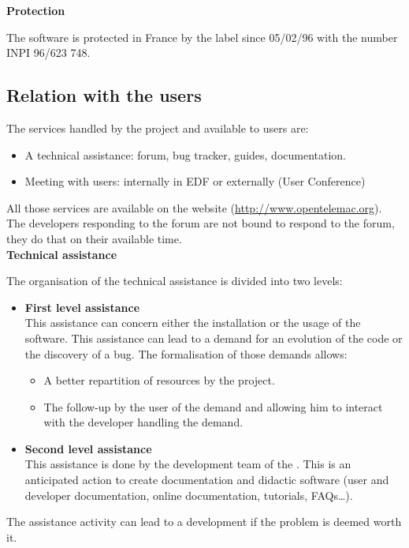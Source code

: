 \textbf{Protection}

The software is protected in France by the label \tel{} since 05/02/96 with the
number INPI 96/623 748.

\subsection{Relation with the \telemacsystem{} users}

The services handled by the \telemacsystem{} project and available to users
are:
\begin{itemize}
\item A technical assistance: forum, bug tracker, guides, documentation.
\item Meeting with users: internally in EDF or externally (User Conference)
\end{itemize}

All those services are available on the \telemacsystem{} website
(\url{http://www.opentelemac.org}).
The developers responding to the forum are not bound to respond to the forum,
they do that on their available time.\\

\textbf{Technical assistance}

The organisation of the technical assistance is divided into two levels:
\begin{itemize}
\item \textbf{First level assistance}\\ This assistance can concern either the
  installation or the usage of the software. This assistance can lead to a
  demand for an evolution of the code or the discovery of a bug. The
  formalisation of those demands allows:
  \begin{itemize}
  \item A better repartition of resources by the project.
  \item The follow-up by the user of the demand and allowing him to interact
    with the developer handling the demand.
  \end{itemize}
\item \textbf{Second level assistance}\\ This assistance is done by the
  development team of the \telemacsystem{}. This is an anticipated action to
  create documentation and didactic software (user and developer documentation,
  online documentation, tutorials, FAQs\ldots).
\end{itemize}

The assistance activity can lead to a development if the problem is deemed
worth it.\\


